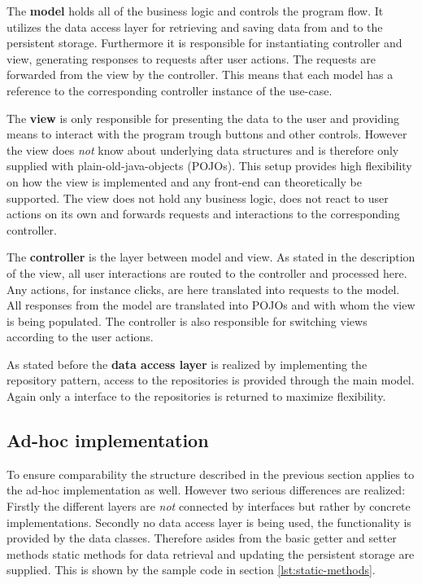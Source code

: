 The \textbf{model} holds all of the business logic and controls the program flow. It utilizes the data access layer for retrieving and saving data from and to the persistent storage. Furthermore it is responsible for instantiating controller and view, generating responses to requests after user actions. The requests are forwarded from the view by the controller. This means that each model has a reference to the corresponding controller instance of the use-case. 

The \textbf{view} is only responsible for presenting the data to the user and providing means to interact with the program trough buttons and other controls. However the view does \emph{not} know about underlying data structures and is therefore only supplied with plain-old-java-objects (POJOs). This setup provides high flexibility on how the view is implemented and any front-end can theoretically be supported. The view does not hold any business logic, does not react to user actions on its own and forwards requests and interactions to the corresponding controller. 

The \textbf{controller} is the layer between model and view. As stated in the description of the view, all user interactions are routed to the controller and processed here. Any actions, for instance clicks, are here translated into requests to the model. All responses from the model are translated into POJOs and with whom the view is being populated. The controller is also responsible for switching views according to the user actions.

As stated before the \textbf{data access layer} is realized by implementing the repository pattern, access to the repositories is provided through the main model.  Again only a interface to the repositories is returned to maximize flexibility.

\subsection{Ad-hoc implementation}
\label{sec:ad-hoc}
To ensure comparability the structure described in the previous section applies to the ad-hoc implementation as well. However two serious differences are realized: Firstly the different layers are \emph{not} connected by interfaces but rather by concrete implementations. Secondly no data access layer is being used, the functionality is provided by the data classes. Therefore asides from the basic getter and setter methods static methods for data retrieval and updating the persistent storage are supplied. This is shown by the sample code in section \ref{lst:static-methods}.


